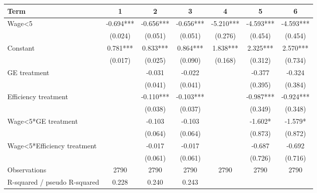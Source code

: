 \begin{tabular}{lcccccc}
\hline
Term & 1 & 2 & 3 & 4 & 5 & 6 \\
\hline
Wage<5 & -0.694*** & -0.656*** & -0.656*** & -5.210*** & -4.593*** & -4.593*** \\
 & (0.024) & (0.051) & (0.051) & (0.276) & (0.454) & (0.454) \\
Constant & 0.781*** & 0.833*** & 0.864*** & 1.838*** & 2.325*** & 2.570*** \\
 & (0.017) & (0.025) & (0.090) & (0.168) & (0.312) & (0.734) \\
GE treatment &  & -0.031 & -0.022 &  & -0.377 & -0.324 \\
 &  & (0.041) & (0.041) &  & (0.395) & (0.384) \\
Efficiency treatment &  & -0.110*** & -0.103*** &  & -0.987*** & -0.924*** \\
 &  & (0.038) & (0.037) &  & (0.349) & (0.348) \\
Wage<5*GE treatment &  & -0.103 & -0.103 &  & -1.602* & -1.579* \\
 &  & (0.064) & (0.064) &  & (0.873) & (0.872) \\
Wage<5*Efficiency treatment &  & -0.017 & -0.017 &  & -0.687 & -0.692 \\
 &  & (0.061) & (0.061) &  & (0.726) & (0.716) \\
Observations & 2790 & 2790 & 2790 & 2790 & 2790 & 2790 \\
R-squared / pseudo R-squared & 0.228 & 0.240 & 0.243 &  &  &  \\
\hline
\end{tabular}
